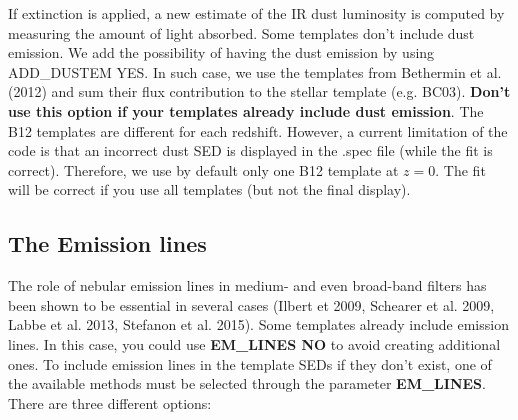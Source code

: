\documentclass[12pt]{article}
\begin{document}
If extinction is applied, a new estimate of the IR dust luminosity is computed by measuring the amount of light absorbed. Some templates don't include dust emission. We add the possibility of having the dust emission by using ADD\_DUSTEM YES. In such case, we use the templates from Bethermin et al. (2012) and sum their flux contribution to the stellar template (e.g. BC03). {\bf Don't use this option if your templates already include dust emission}. The B12 templates are different for each redshift. However, a current limitation of the code is that an incorrect dust SED is displayed in the .spec file (while the fit is correct). Therefore, we use by default only one B12 template at $z=0$. The fit will be correct if you use all templates (but not the final display).
 
  
\subsection{The Emission lines}

 The role of nebular emission lines in medium- and even broad-band  filters has been shown to be essential in several cases (Ilbert et 2009, Schearer et al. 2009, Labbe et al. 2013, Stefanon et al. 2015). Some templates already include emission lines. In this case, you could use {\bf EM\_LINES NO} to avoid creating additional ones. To include emission lines in the template SEDs if they don't exist, one of the available methods must be selected through  the parameter \textbf{EM\_LINES}. 
 There are three different options: 
 
\end{document}
